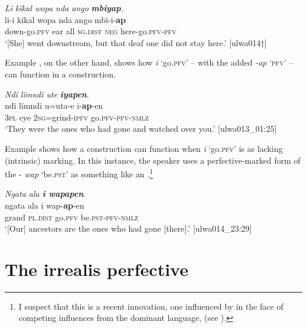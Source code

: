 \ea%
    \label{ex:verbs:52}
          \textit{Li kïkal wopa nda ango} \textbf{\textit{mbiyap}}.\\
\gll li-i        kïkal  wopa  nda      ango  mbï-i-\textbf{ap}\\
    down-go.\textsc{pfv}  ear    all    \textsc{sg.dist}  \textsc{neg}  here-go.\textsc{pfv}{}-\textsc{pfv}\\
\glt `[She] went downstream, but that deaf one did not stay here.’ [ulwa014†]
\z

Example , on the other hand, shows how \textit{i} ‘go.\textsc{pfv}’ -- with the added  \textit{-ap} ‘\textsc{pfv}’ -- can function in a  construction.

\ea%
    \label{ex:verbs:53}
          \textit{Ndï lïmndï ute} \textbf{\textit{iyapen}}.\\
\gll ndï  lïmndï  u=uta-e      i-\textbf{ap}{}-en\\
    3\textsc{pl}  eye   2\textsc{sg}=grind-\textsc{ipfv}  go.\textsc{pfv-pfv-nmlz}\\
\glt `They were the ones who had gone and watched over you.’ [ulwa013\_01:25]
\z

Example  shows how a  construction can function when \textit{i} ‘go.\textsc{pfv}’ is  as lacking (intrinsic)  marking. In this instance, the speaker uses a perfective-marked form of the -  \textit{wap} ‘be.\textsc{pst}’ as something like an .\footnote{I suspect that this is a recent innovation, one influenced by  in the face of competing influences from the dominant language,  (see ).}


\ea%
    \label{ex:verbs:54}
          \textit{Ngata ala \textbf{i wapapen}}.\\
\gll ngata  ala       i    wap-\textbf{ap}-en\\
    grand  \textsc{pl.dist}  go.\textsc{pfv}  be.\textsc{pst-pfv-nmlz}\\
\glt `[Our] ancestors are the ones who had gone [there].’ [ulwa014\_23:29]
\z

\section{The irrealis perfective}\label{sec:4.9}

